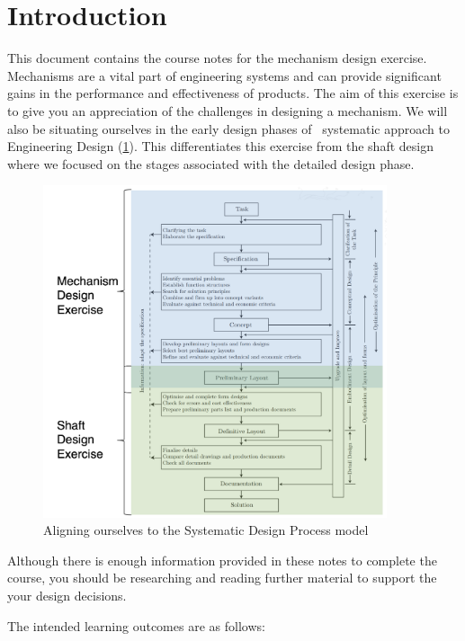 \section{Introduction} 

This document contains the course notes for the mechanism design exercise. Mechanisms are a vital part of engineering systems and can provide significant gains in the performance and effectiveness of products. The aim of this exercise is to give you an appreciation of the challenges in designing a mechanism. We will also be situating ourselves in the early design phases of~\citet{pahl2013} systematic approach to Engineering Design (\cref{fig-design-process}). This differentiates this exercise from the shaft design where we focused on the stages associated with the detailed design phase.

\begin{figure}
  \centering
  \includegraphics[width=0.9\textwidth]{figs/design-process.png}
  \caption[Aligning ourselves to the Systematic Design Process model]{Aligning ourselves to the Systematic Design Process model~\citep{pahl2013}}
  \label{fig-design-process}
\end{figure}

Although there is enough information provided in these notes to complete the course, you should be researching and reading further material to support the your design decisions.

 The intended learning outcomes are as follows:

